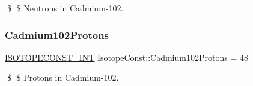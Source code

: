 \$ \$ Neutrons in Cadmium-\/102. \mbox{\label{group___isotope_const-_cadmium-_cd102_gab3aa2d468404c97c81d82ddd12b2c740}} 
\subsubsection{\texorpdfstring{Cadmium102\+Protons}{Cadmium102Protons}}
{\footnotesize\ttfamily \mbox{\hyperlink{group___isotope_const-_macros_ga5f18360b3e99483a35c32d789e62621c}{I\+S\+O\+T\+O\+P\+E\+C\+O\+N\+S\+T\+\_\+\+I\+NT}} Isotope\+Const\+::\+Cadmium102\+Protons = 48}

\$ \$ Protons in Cadmium-\/102. 